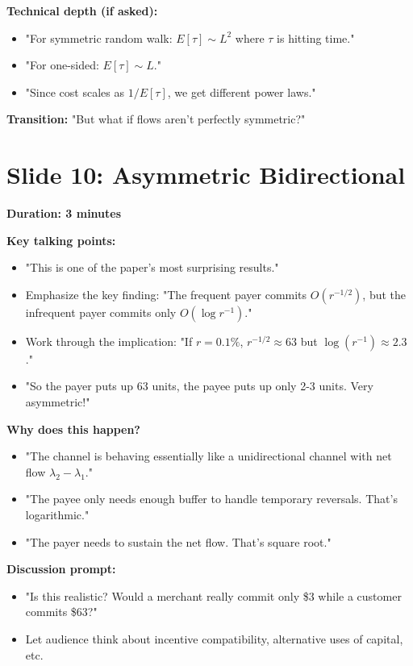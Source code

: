 \documentclass[11pt]{article}
\begin{document}
\textbf{Technical depth (if asked):}
\begin{itemize}
    \item "For symmetric random walk: $E[\tau] \sim L^2$ where $\tau$ is hitting time."
    \item "For one-sided: $E[\tau] \sim L$."
    \item "Since cost scales as $1/E[\tau]$, we get different power laws."
\end{itemize}

\textbf{Transition:} "But what if flows aren't perfectly symmetric?"

\section*{Slide 10: Asymmetric Bidirectional}

\textbf{Duration: 3 minutes}

\textbf{Key talking points:}
\begin{itemize}
    \item "This is one of the paper's most surprising results."
    \item Emphasize the key finding: "The frequent payer commits $O(r^{-1/2})$, but the infrequent payer commits only $O(\log r^{-1})$."
    \item Work through the implication: "If $r = 0.1\%$, $r^{-1/2} \approx 63$ but $\log(r^{-1}) \approx 2.3$."
    \item "So the payer puts up 63 units, the payee puts up only 2-3 units. Very asymmetric!"
\end{itemize}

\textbf{Why does this happen?}
\begin{itemize}
    \item "The channel is behaving essentially like a unidirectional channel with net flow $\lambda_2 - \lambda_1$."
    \item "The payee only needs enough buffer to handle temporary reversals. That's logarithmic."
    \item "The payer needs to sustain the net flow. That's square root."
\end{itemize}

\textbf{Discussion prompt:}
\begin{itemize}
    \item "Is this realistic? Would a merchant really commit only \$3 while a customer commits \$63?"
    \item Let audience think about incentive compatibility, alternative uses of capital, etc.
\end{itemize}
\end{document}
